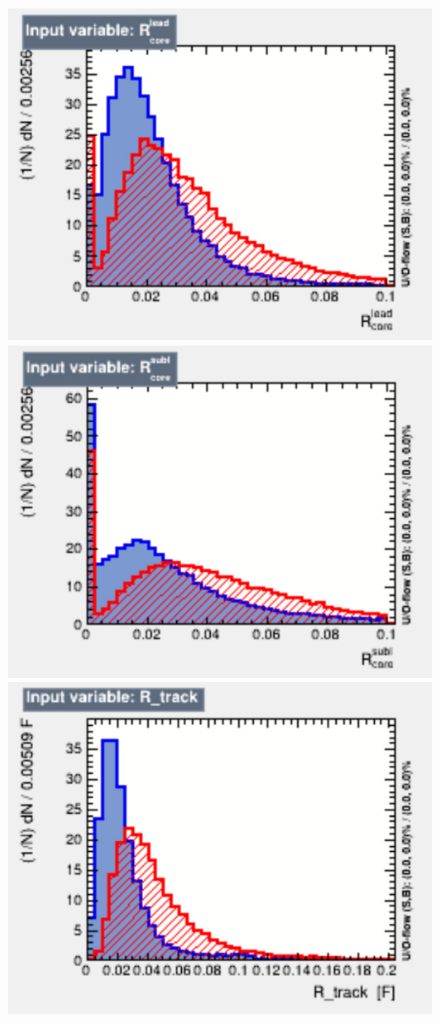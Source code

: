 \begin{figure}[th!]
    \includegraphics[width=\individualPlotWidth]{Assets/Plots/DiTau/BDT_vars/R_lead_core.pdf}
    \includegraphics[width=\individualPlotWidth]{Assets/Plots/DiTau/BDT_vars/R_subl_core.pdf}
    \includegraphics[width=\individualPlotWidth]{Assets/Plots/DiTau/BDT_vars/R_track.pdf}

\end{figure}
